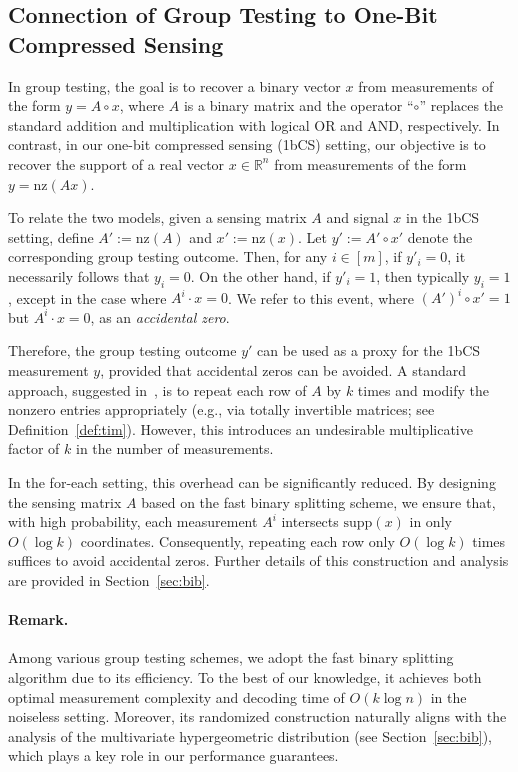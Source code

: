 \documentclass{article}
\newcommand{\supp}{\mathrm{supp}}
\newcommand{\nz}{\mathrm{nz}}
\begin{document}
\subsection{Connection of Group Testing to One-Bit Compressed Sensing}\label{sec:gt1bcs}

In group testing, the goal is to recover a binary vector $x$ from measurements of the form $y = A \circ x$, where $A$ is a binary matrix and the operator ``$\circ$'' replaces the standard addition and multiplication with logical OR and AND, respectively. In contrast, in our one-bit compressed sensing (1bCS) setting, our objective is to recover the support of a real vector $x \in \mathbb{R}^n$ from measurements of the form $y = \nz(Ax)$.

To relate the two models, given a sensing matrix $A$ and signal $x$ in the 1bCS setting, define $A' := \nz(A)$ and $x' := \nz(x)$. Let $y' := A' \circ x'$ denote the corresponding group testing outcome. Then, for any $i \in [m]$, if $y'_i = 0$, it necessarily follows that $y_i = 0$. On the other hand, if $y'_i = 1$, then typically $y_i = 1$, except in the case where $A^i \cdot x = 0$. We refer to this event, where $(A')^i \circ x' = 1$ but $A^i \cdot x = 0$, as an \emph{accidental zero}.

Therefore, the group testing outcome $y'$ can be used as a proxy for the 1bCS measurement $y$, provided that accidental zeros can be avoided. A standard approach, suggested in~\cite{matsumoto2023improved}, is to repeat each row of $A$ by $k$ times and modify the nonzero entries appropriately (e.g., via totally invertible matrices; see Definition~\ref{def:tim}). However, this introduces an undesirable multiplicative factor of $k$ in the number of measurements.

In the for-each setting, this overhead can be significantly reduced. By designing the sensing matrix $A$ based on the fast binary splitting scheme, we ensure that, with high probability, each measurement $A^i$ intersects $\supp(x)$ in only $O(\log k)$ coordinates. Consequently, repeating each row only $O(\log k)$ times suffices to avoid accidental zeros. Further details of this construction and analysis are provided in Section~\ref{sec:bib}.

\paragraph{Remark.}
Among various group testing schemes, we adopt the fast binary splitting algorithm due to its efficiency. To the best of our knowledge, it achieves both optimal measurement complexity and decoding time of $O(k \log n)$ in the noiseless setting. Moreover, its randomized construction naturally aligns with the analysis of the multivariate hypergeometric distribution (see Section~\ref{sec:bib}), which plays a key role in our performance guarantees.
\end{document}
